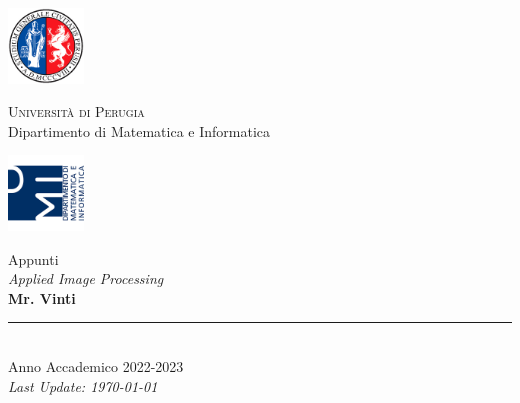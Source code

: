 
\thispagestyle{empty} %

\noindent %
\includegraphics[width=0.15\textwidth]{frontmatter/imgs/logoUniPg.jpg}
\begin{minipage}[b]{0.7\textwidth}
    \centering
    {\Large \textsc{Universit{\`a} di Perugia}}\\
    \vspace{0.4 em}
    {\large Dipartimento di Matematica e Informatica}
    \vspace{0.6 em}
\end{minipage}%
\includegraphics[width=0.15\textwidth]{frontmatter/imgs/logoDMI.jpg}

\vspace{8 em}

\begin{center}
    {\Huge Appunti}\\
    \vspace{2 em}
    {\Huge \textit{Applied Image Processing}}\\
    \vspace{5 em}
    {\Huge \textbf{Mr. Vinti}}\\

    \vfill

    \rule{380pt}{.4pt}\\
    \vspace{1.2 em}
    \large{Anno Accademico 2022-2023}\\
    \vspace{.9 em}
    \small{\textit{Last Update: \today{}}}
\end{center}

